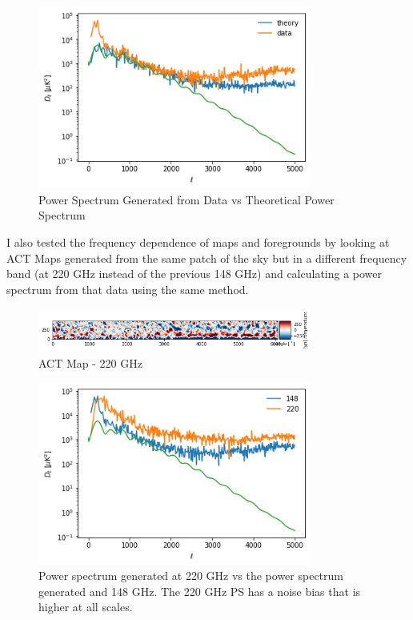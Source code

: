 \documentclass[12pt]{article}
\begin{document}
\begin{figure}[H]
    \centering
    \includegraphics[width=0.8\textwidth]{images/ACT PS.png}
    \caption{Power Spectrum Generated from Data vs Theoretical Power Spectrum}
    \label{fig:my_label}
\end{figure}

I also tested the frequency dependence of maps and foregrounds by looking at ACT Maps generated from the same patch of the sky but in a different frequency band (at 220 GHz instead of the previous 148 GHz) and calculating a power spectrum from that data using the same method.

\begin{figure}[H]
    \centering
    \includegraphics[width=0.8\textwidth]{images/diff fb act.png}
    \caption{ACT Map - 220 GHz}
    \label{fig:my_label}
\end{figure}

\begin{figure}[H]
    \centering
    \includegraphics[width=0.8\textwidth]{images/PS 220.png}
    \caption{Power spectrum generated at 220 GHz vs the power spectrum generated and 148 GHz. The 220 GHz PS has a noise bias that is higher at all scales.}
    \label{fig:my_label}
\end{figure}
\end{document}
